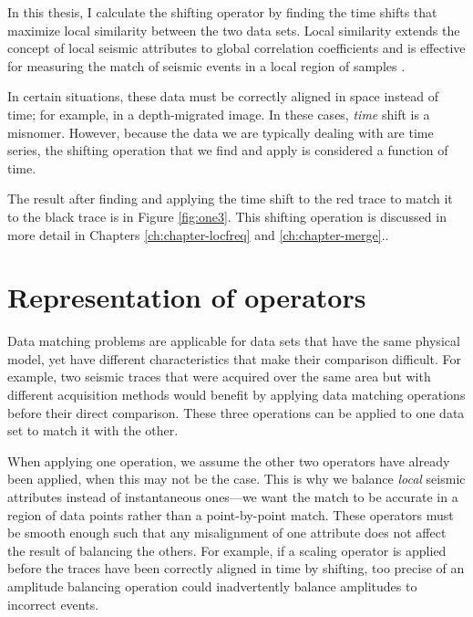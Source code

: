 In this thesis, I calculate the shifting operator by finding the time shifts that maximize local similarity between the two data sets.
Local similarity extends the concept of local seismic attributes to global correlation coefficients and is effective for measuring the match of seismic events in a local region of samples \cite[]{attr}.

In certain situations, these data must be correctly aligned in space instead of time; for example, in a depth-migrated image.
In these cases, {\em time} shift is a misnomer. 
However, because the data we are typically dealing with are time series, the shifting operation that we find and apply is considered a function of time.

The result after finding and applying the time shift to the red trace to match it to the black trace is in Figure \ref{fig:one3}.
This shifting operation is discussed in more detail in Chapters \ref{ch:chapter-locfreq} and \ref{ch:chapter-merge}..


\section{Representation of operators}
Data matching problems are applicable for data sets that have the same physical model, yet have different characteristics that make their comparison difficult.
For example, two seismic traces that were acquired over the same area but with different acquisition methods would benefit by applying data matching operations before their direct comparison. 
These three operations can be applied to one data set to match it with the other.

When applying one operation, we assume the other two operators have already been applied, when this may not be the case.
This is why we balance {\em local} seismic attributes instead of instantaneous ones---we want the match to be accurate in a region of data points rather than a point-by-point match.
These operators must be smooth enough such that any misalignment of one attribute does not affect the result of balancing the others.
For example, if a scaling operator is applied before the traces have been correctly aligned in time by shifting, 
too precise of an amplitude balancing operation could inadvertently balance amplitudes to incorrect events.

